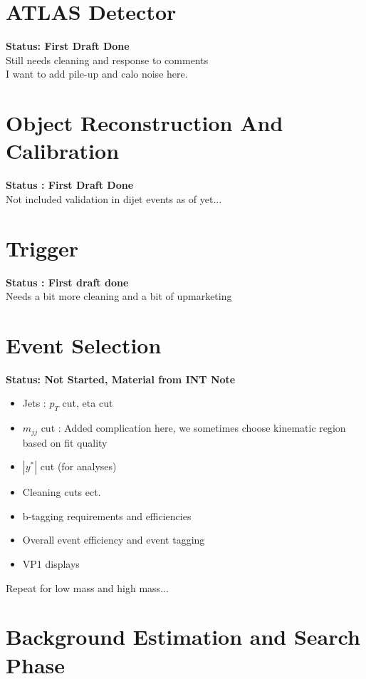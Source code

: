 \section{ATLAS Detector}

\textbf{Status: First Draft Done}\\
\noindent
Still needs cleaning and response to comments\\
I want to add pile-up and calo noise here.\\
\noindent

\section{Object Reconstruction And Calibration}

\textbf{Status : First Draft Done}\\
\noindent
Not included validation in dijet events as of yet...\\
  
\section{Trigger}

\textbf{Status : First draft done}\\
\noindent
Needs a bit more cleaning and a bit of upmarketing

\section{Event Selection}

\textbf{Status: Not Started, Material from INT Note}

  \begin{itemize}
  \item{Jets : $p_{T}$ cut, eta cut}
  \item{$m_{jj}$ cut : Added complication here, we sometimes choose kinematic region based on fit quality}
  \item{$|y^*|$ cut (for analyses)}
  \item{Cleaning cuts ect.}
  \item{b-tagging requirements and efficiencies}
  \item{Overall event efficiency and event tagging}
  \item{VP1 displays}
  \end{itemize}

 Repeat for low mass and high mass...

\section{Background Estimation and Search Phase}


